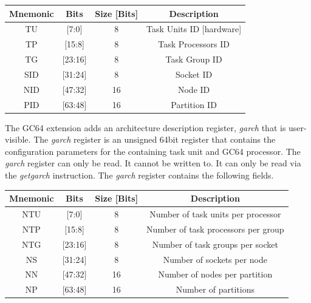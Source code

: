 \documentclass{article}
\begin{document}
\begin{center}
\begin{tabular}{| c | c | c | c |}
\hline
Mnemonic & Bits & Size [Bits] & Description \\ 
\hline \hline
TU & [7:0] & 8 & Task Units ID [hardware] \\
\hline
TP & [15:8] & 8 & Task Processors ID \\
\hline
TG & [23:16] & 8 & Task Group ID \\
\hline
SID & [31:24] & 8 & Socket ID \\
\hline
NID & [47:32] & 16 & Node ID \\
\hline
PID & [63:48] & 16 & Partition ID \\
\hline 

\end{tabular}
\end{center} 

\begin{center}
\end{center}

The GC64 extension adds an architecture description register, \emph{garch} that is user-visible.  The \emph{garch} register is an unsigned 64bit register that contains the configuration parameters for the containing task unit and GC64 processor.  The \emph{garch} register can only be read.  It cannot be written to.  It can only be read via the \emph{getgarch} instruction.  The \emph{garch} register contains the following fields.  

\begin{center}
\begin{tabular}{| c | c | c | c |}
\hline
Mnemonic & Bits & Size [Bits] & Description \\ 
\hline \hline
NTU & [7:0] & 8 & Number of task units per processor \\
\hline
NTP & [15:8] & 8 & Number of task processors per group \\
\hline
NTG & [23:16] & 8 & Number of task groups per socket \\
\hline
NS & [31:24] & 8 & Number of sockets per node \\
\hline
NN & [47:32] & 16 & Number of nodes per partition \\
\hline
NP & [63:48] & 16 & Number of partitions \\
\hline 

\end{tabular}
\end{center} 
\end{document}

